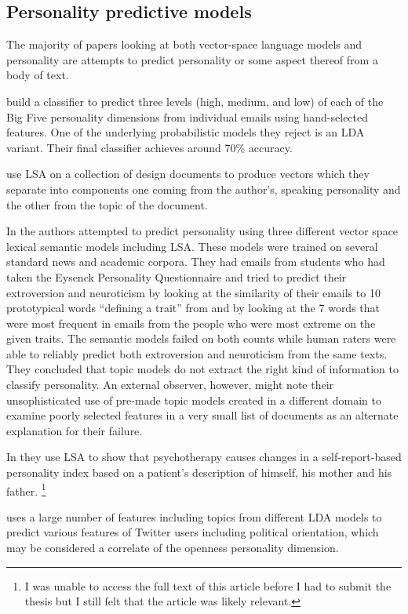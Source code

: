 \subsection{Personality predictive models}

The majority of papers looking at both vector-space language models and 
personality are attempts to predict personality or some aspect thereof from a 
body of text.

\citep{Shen2013} build a classifier to predict three levels
(high, medium, and low) of each of the Big Five personality dimensions from
individual emails using hand-selected features. One of the underlying 
probabilistic models they reject is an LDA variant. Their final classifier
achieves around 70\% accuracy.

\citep{Hill2001} use LSA on a collection of design documents
to produce vectors which they separate into components one coming from 
the author's, speaking personality and the other from the topic of the document.

In \citep{Gill2007} the authors attempted to predict personality using three 
different vector space lexical semantic models including LSA. These models were 
trained on several standard news and academic corpora. They had emails from 
students who had taken the Eysenck Personality Questionnaire and tried to 
predict their extroversion and neuroticism by looking at the similarity of their 
emails to 10 prototypical words ``defining a trait'' from \citep{Goldberg1992} 
and by looking at the 7 words that were most frequent in emails from the people 
who were most extreme on the given traits. The semantic models failed on both 
counts while human raters were able to reliably predict both extroversion and 
neuroticism from the same texts. They concluded that topic models do not extract 
the right kind of information to classify personality. An external observer, 
however, might note their unsophisticated use of pre-made topic models created 
in a different domain to examine poorly selected features in a very small list 
of documents as an alternate explanation for their failure.

In \citep{Arvidsson2011} they use LSA to show that psychotherapy causes changes 
in a self-report-based personality index based on a patient's description of 
himself, his mother and his father. \footnote{I was unable to access the full 
text of this article before I had to submit the thesis but I still felt that the 
article was likely relevant.}

\citep{Pennacchiotti2011} uses a large number of features including topics
from different LDA models to predict various features of Twitter users including
political orientation, which may be considered a correlate of the openness
personality dimension.

